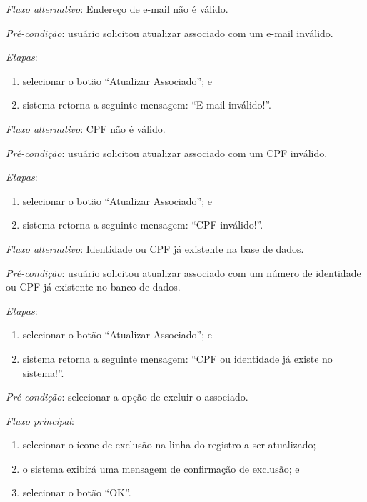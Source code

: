\noindent \textit{Fluxo alternativo}: Endereço de e-mail não é válido.

\noindent \textit{Pré-condição}: usuário solicitou atualizar associado com um e-mail inválido.

\noindent \textit{Etapas}:

\begin{enumerate}
    \item selecionar o botão ``Atualizar Associado''; e
    \item sistema retorna a seguinte mensagem: ``E-mail inválido!''.
\end{enumerate}


\noindent \textit{Fluxo alternativo}: CPF não é válido.

\noindent \textit{Pré-condição}: usuário solicitou atualizar associado com um CPF inválido.

\noindent \textit{Etapas}:

\begin{enumerate}
    \item selecionar o botão ``Atualizar Associado''; e
    \item sistema retorna a seguinte mensagem: ``CPF inválido!''.
\end{enumerate}


\noindent \textit{Fluxo alternativo}: Identidade ou CPF já existente na base de dados.

\noindent \textit{Pré-condição}: usuário solicitou atualizar associado com um número de identidade ou CPF já existente no banco de dados.

\noindent \textit{Etapas}:

\begin{enumerate}
    \item selecionar o botão ``Atualizar Associado''; e
    \item sistema retorna a seguinte mensagem: ``CPF ou identidade já existe no sistema!''.
\end{enumerate}



\vspace{0.7cm}

\noindent \textit{Pré-condição}: selecionar a opção de excluir o associado.

\noindent \textit{Fluxo principal}:

\begin{enumerate}
    \item selecionar o ícone de exclusão na linha do registro a ser atualizado;
    \item o sistema exibirá uma mensagem de confirmação de exclusão; e
    \item selecionar o botão ``OK''.
\end{enumerate}

